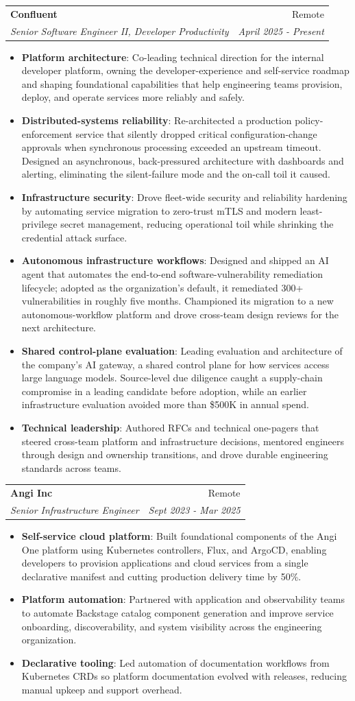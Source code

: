 \documentclass[letterpaper,11pt]{article}
\makeatletter
\newcommand{\resumeItem}[2]{
\item\small{\textbf{#1}{: #2 \vspace{-2pt}}}
}
\newcommand{\resumeSubheading}[4]{
\vspace{-1pt}\item
\begin{tabular*}{0.97\textwidth}[t]{l@{\extracolsep{\fill}}r}
    \textbf{#1} & #2 \\
    \textit{\small#3} & \textit{\small #4} \\
\end{tabular*}\vspace{-3pt}
}
\newcommand{\resumeItemListStart}{\begin{itemize}}
\newcommand{\resumeItemListEnd}{\end{itemize}\vspace{-5pt}}
\makeatother
\begin{document}
\resumeSubheading
{Confluent}{Remote}
{Senior Software Engineer II, Developer Productivity}{April 2025 - Present}
\resumeItemListStart
\resumeItem{Platform architecture}
{Co-leading technical direction for the internal developer platform, owning the developer-experience and self-service roadmap and shaping foundational capabilities that help engineering teams provision, deploy, and operate services more reliably and safely.}
\resumeItem{Distributed-systems reliability}
{Re-architected a production policy-enforcement service that silently dropped critical configuration-change approvals when synchronous processing exceeded an upstream timeout. Designed an asynchronous, back-pressured architecture with dashboards and alerting, eliminating the silent-failure mode and the on-call toil it caused.}
\resumeItem{Infrastructure security}
{Drove fleet-wide security and reliability hardening by automating service migration to zero-trust mTLS and modern least-privilege secret management, reducing operational toil while shrinking the credential attack surface.}
\resumeItem{Autonomous infrastructure workflows}
{Designed and shipped an AI agent that automates the end-to-end software-vulnerability remediation lifecycle; adopted as the organization's default, it remediated 300+ vulnerabilities in roughly five months. Championed its migration to a new autonomous-workflow platform and drove cross-team design reviews for the next architecture.}
\resumeItem{Shared control-plane evaluation}
{Leading evaluation and architecture of the company's AI gateway, a shared control plane for how services access large language models. Source-level due diligence caught a supply-chain compromise in a leading candidate before adoption, while an earlier infrastructure evaluation avoided more than \$500K in annual spend.}
\resumeItem{Technical leadership}
{Authored RFCs and technical one-pagers that steered cross-team platform and infrastructure decisions, mentored engineers through design and ownership transitions, and drove durable engineering standards across teams.}
\resumeItemListEnd

\resumeSubheading
{Angi Inc}{Remote}
{Senior Infrastructure Engineer}{Sept 2023 - Mar 2025}
\resumeItemListStart
\resumeItem{Self-service cloud platform}
{Built foundational components of the Angi One platform using Kubernetes controllers, Flux, and ArgoCD, enabling developers to provision applications and cloud services from a single declarative manifest and cutting production delivery time by 50\%.}
\resumeItem{Platform automation}
{Partnered with application and observability teams to automate Backstage catalog component generation and improve service onboarding, discoverability, and system visibility across the engineering organization.}
\resumeItem{Declarative tooling}
{Led automation of documentation workflows from Kubernetes CRDs so platform documentation evolved with releases, reducing manual upkeep and support overhead.}
\resumeItemListEnd
\end{document}
